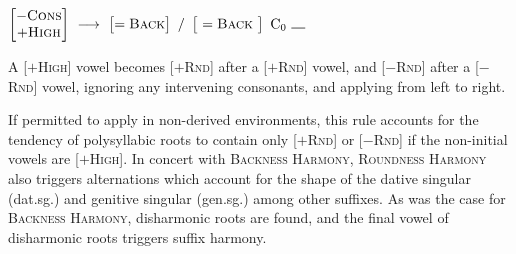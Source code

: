 \begin{example}
$\begin{bmatrix} -\textsc{Cons} \\ +\textsc{High} \end{bmatrix}~\goesto~\begin{bmatrix} =\textsc{Back} \end{bmatrix}~/~\begin{bmatrix}~=\textsc{Back}~\end{bmatrix}~\textrm{C}_0~\gap$
\end{example}

\noindent
A [$+$\textsc{High}] vowel becomes [$+$\textsc{Rnd}] after a [$+$\textsc{Rnd}] vowel, and [$-$\textsc{Rnd}] after a [$-$\textsc{Rnd}] vowel, ignoring any intervening consonants, and applying from left to right. 

If permitted to apply in non-derived environments, this rule accounts for the tendency of polysyllabic roots to contain only [$+$\textsc{Rnd}] or [$-$\textsc{Rnd}] if the non-initial vowels are [$+$\textsc{High}]. In concert with \textsc{Backness Harmony}, \textsc{Roundness Harmony} also triggers alternations which account for the shape of the dative singular (dat.sg.) and genitive singular (gen.sg.) among other suffixes. As was the case for \textsc{Backness Harmony}, disharmonic roots are found, and the final vowel of disharmonic roots triggers suffix harmony.

